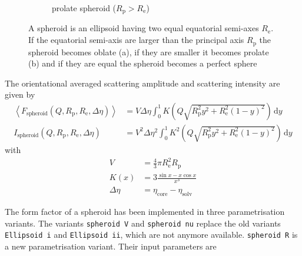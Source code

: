 \begin{figure}[htb]
\begin{subfigure}[b]{.48\textwidth}
   \caption{prolate spheroid ($R_\mathrm{p} > R_\mathrm{e} $)}
   \label{fig:prolateSpheroid}
\end{subfigure}
\caption{A spheroid is an ellipsoid having two equal equatorial semi-axes $R_\mathrm{e}$. If the equatorial
semi-axis are larger than the principal axis $R_\mathrm{p}$ the spheroid becomes oblate (a), if they are smaller
it becomes prolate (b) and if they are equal the spheroid becomes a perfect sphere}
\label{prolate oblate}
\end{figure}

The orientational averaged scattering amplitude and scattering intensity are given by \cite{Guinier1939}
\begin{align}
\left\langle F_\text{spheroid}(Q,R_\mathrm{p},R_\mathrm{e},\Delta\eta)\right\rangle &= V\Delta\eta
 \int_0^{1}\! K\left(Q\sqrt{R_\mathrm{p}^2y^2+R_\mathrm{e}^2(1-y)^2}\right) \, \mathrm{d}y \\
I_\text{spheroid}(Q,R_\mathrm{p},R_\mathrm{e},\Delta\eta) &=  V^2\Delta\eta^2
 \int_0^{1}\! K^2\left(Q\sqrt{R_\mathrm{p}^2y^2+R_\mathrm{e}^2(1-y)^2}\right) \, \mathrm{d}y
\end{align}
with
\begin{align}
V &= \frac{4}{3}\pi R_\mathrm{e}^2R_\mathrm{p}\\
K(x) &= 3 \frac{\sin x - x \cos x}{x^3}\\
\Delta \eta &= \eta_\mathrm{core}-\eta_\mathrm{solv}
\end{align}

The form factor of a spheroid has been implemented in three parametrisation variants.
The variants \texttt{spheroid V} and \texttt{spheroid nu} replace the old variants \texttt{Ellipsoid i} and \texttt{Ellipsoid ii}, which are not anymore available. \texttt{spheroid R} is a new parametrisation variant. Their input parameters are

